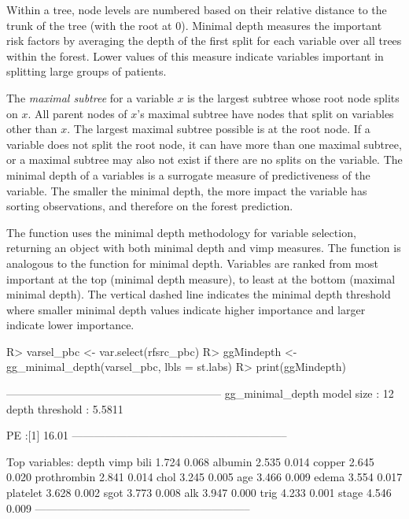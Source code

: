 \documentclass[nojss]{jss}\usepackage[]{graphicx}\usepackage[]{color}
\begin{document}
Within a tree, node levels are numbered based on their relative distance to the trunk of the tree (with the root at 0). Minimal depth measures the important risk factors by averaging the depth of the first split for each variable over all trees within the forest. Lower values of this measure indicate variables important in splitting large groups of patients. 

The \emph{maximal subtree} for a variable $x$ is the largest subtree whose root node splits on $x$. All parent nodes of $x$'s maximal subtree have nodes that split on variables other than $x$. The largest maximal subtree possible is at the root node. If a variable does not split the root node, it can have more than one maximal subtree, or a maximal subtree may also not exist if there are no splits on the variable. The minimal depth of a variables is a surrogate measure of predictiveness of the variable. The smaller the minimal depth, the more impact the variable has sorting observations, and therefore on the forest prediction. 

The   function uses the minimal depth methodology for variable selection, returning an object with both minimal depth and vimp measures. The   function is analogous to the  function for minimal depth. Variables are ranked from most important at the top (minimal depth measure), to least at the bottom (maximal minimal depth). The vertical dashed line indicates the minimal depth threshold where smaller minimal depth values indicate higher importance and larger indicate lower importance.

\begin{Schunk}
\begin{Sinput}
R> varsel_pbc <- var.select(rfsrc_pbc)
R> ggMindepth <- gg_minimal_depth(varsel_pbc, lbls = st.labs)
R> print(ggMindepth)
\end{Sinput}
\end{Schunk}

\begin{Schunk}
\begin{Soutput}
-----------------------------------------------------------
gg_minimal_depth
model size         : 12 
depth threshold    : 5.5811 

PE :[1] 16.01
-----------------------------------------------------------

Top variables:
            depth  vimp
bili        1.724 0.068
albumin     2.535 0.014
copper      2.645 0.020
prothrombin 2.841 0.014
chol        3.245 0.005
age         3.466 0.009
edema       3.554 0.017
platelet    3.628 0.002
sgot        3.773 0.008
alk         3.947 0.000
trig        4.233 0.001
stage       4.546 0.009
-----------------------------------------------------------
\end{Soutput}
\end{Schunk}
\end{document}
